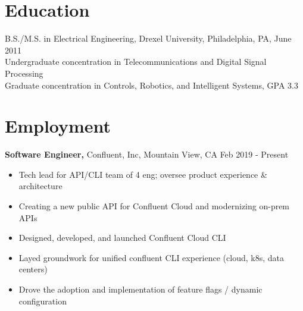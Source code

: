 \documentclass[margin]{res}
\begin{document}
 
 
 
\address{311 Marengo Ave. \#2 \\ Forest Park, IL 60130  \\
        (215) 501-7891 }

\begin{resume} 


\section{Education} 
B.S./M.S. in Electrical Engineering, Drexel University, Philadelphia, PA, June 2011 \\
Undergraduate concentration in Telecommunications and Digital Signal Processing \\
Graduate concentration in Controls, Robotics, and Intelligent Systems, GPA 3.3 

\section{Employment}
{\bf Software Engineer,} Confluent, Inc, Mountain View, CA \hfill Feb 2019 - Present
\begin{itemize} \itemsep -2pt  %
  \item Tech lead for API/CLI team of 4 eng; oversee product experience \& architecture
  \item Creating a new public API for Confluent Cloud and modernizing on-prem APIs
  \item Designed, developed, and launched Confluent Cloud CLI
  \item Layed groundwork for unified confluent CLI experience (cloud, k8s, data centers)
  \item Drove the adoption and implementation of feature flags / dynamic configuration
 \end{itemize}


\end{resume}
\end{document}
